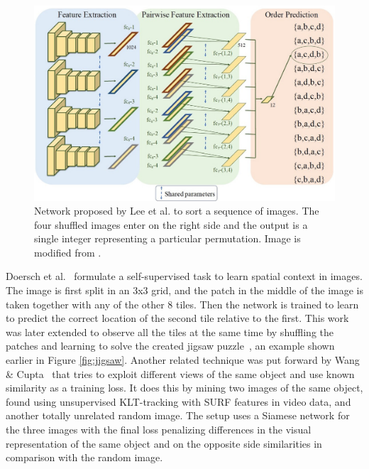 \begin{figure}[t]
\centering
\includegraphics[width=\textwidth]{images/sorting_sequences.jpg}
\caption{Network proposed by Lee et al.\cite{lee2017} to sort a sequence of images. The four shuffled images enter on the right side and the output is a single integer representing a particular permutation. Image is modified from \cite{lee2017}.}
\label{fig:sorting_sequence}
\end{figure}

Doersch et al.~\cite{doersch2015} formulate a self-supervised task to learn spatial context in images. The image is first split in an 3x3 grid, and the patch in the middle of the image is taken together with any of the other 8 tiles. Then the network is trained to learn to predict the correct location of the second tile relative to the first. This work was later extended to observe all the tiles at the same time by shuffling the patches and learning to solve the created jigsaw puzzle~\cite{noroozi2016}, an example shown earlier in Figure \ref{fig:jigsaw}. Another related technique was put forward by Wang \& Cupta~\cite{wang2015} that tries to exploit different views of the same object and use known similarity as a training loss. It does this by mining two images of the same object, found using unsupervised KLT-tracking with SURF features in video data, and another totally unrelated random image. The setup uses a Siamese network for the three images with the final loss penalizing differences in the visual representation of the same object and on the opposite side similarities in comparison with the random image.

